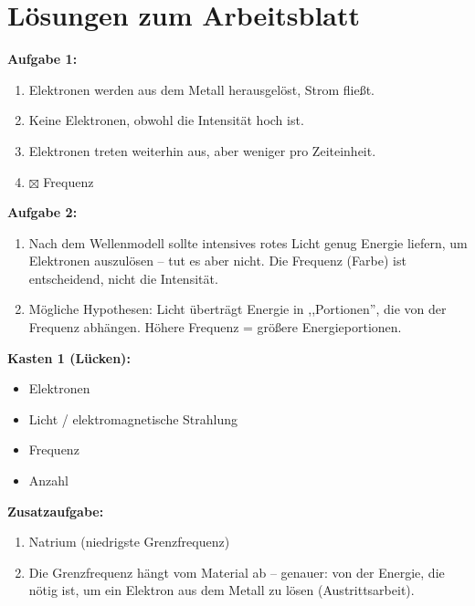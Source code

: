 \documentclass[11pt,a4paper]{article}
\begin{document}
\vspace{1em}


\section*{Lösungen zum Arbeitsblatt}

\textbf{Aufgabe 1:}
\begin{enumerate}[label=\alph)}]
\item {\color{loesung} Elektronen werden aus dem Metall herausgelöst, Strom fließt.}
\item {\color{loesung} Keine Elektronen, obwohl die Intensität hoch ist.}
\item {\color{loesung} Elektronen treten weiterhin aus, aber weniger pro Zeiteinheit.}
\item {\color{loesung} $\boxtimes$ Frequenz}
\end{enumerate}

\textbf{Aufgabe 2:}
\begin{enumerate}[label=\alph)]
\item {\color{loesung} Nach dem Wellenmodell sollte intensives rotes Licht genug Energie liefern, um Elektronen auszulösen -- tut es aber nicht. Die Frequenz (Farbe) ist entscheidend, nicht die Intensität.}
\item {\color{loesung} Mögliche Hypothesen: Licht überträgt Energie in ,,Portionen'', die von der Frequenz abhängen. Höhere Frequenz = größere Energieportionen.}
\end{enumerate}

\textbf{Kasten 1 (Lücken):}
\begin{itemize}[nosep]
\item {\color{loesung} Elektronen}
\item {\color{loesung} Licht / elektromagnetische Strahlung}
\item {\color{loesung} Frequenz}
\item {\color{loesung} Anzahl}
\end{itemize}

\textbf{Zusatzaufgabe:}
\begin{enumerate}[label=\alph)]
\item {\color{loesung} Natrium (niedrigste Grenzfrequenz)}
\item {\color{loesung} Die Grenzfrequenz hängt vom Material ab -- genauer: von der Energie, die nötig ist, um ein Elektron aus dem Metall zu lösen (Austrittsarbeit).}
\end{enumerate}
\end{document}
